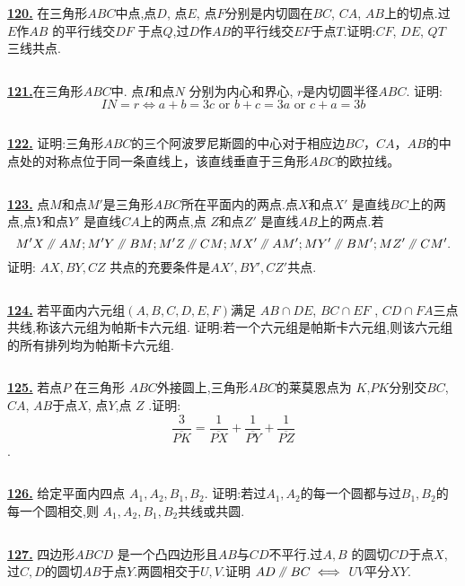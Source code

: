 \documentclass{article}
\newcommand\pxx{%
\mathrel{\text{\tikz[baseline] \draw (0em,-0.3ex) -- (.4em,1.7ex) (.2em,-0.3ex) -- (.6em,1.7ex);}%
}}
\begin{document}
$$ $$


\href{ http://www.artofproblemsolving.com/Forum/viewtopic.php?p=143448#p143448
}{\bf 120.} 在三角形$ABC$中点,点$D$, 点$E$, 点$F$分别是内切圆在$BC$, $CA$, $AB$上的切点.过$E$作$AB$ 的平行线交$DF$ 于点$Q$,过$D$作$AB$的平行线交$EF$于点$T$.证明:$CF$, $DE$, $QT$ 三线共点.


$$ $$


\href{ http://www.artofproblemsolving.com/Forum/viewtopic.php?p=144399#p144399
}{\bf 121.}在三角形$ABC$中. 点$I$和点$N$ 分别为内心和界心, $r$是内切圆半径$ABC.$ 证明:
$$IN=r \iff  a+b=3c \text{ or } b+c=3a \text{ or } c+a=3b$$


$$ $$


\href{http://www.artofproblemsolving.com/Forum/viewtopic.php?p=149725#p149725
 }{\bf 122.} 证明:三角形$ABC$的三个阿波罗尼斯圆的中心对于相应边$BC$，$CA$，$AB$的中点处的对称点位于同一条直线上，该直线垂直于三角形$ABC$的欧拉线。


$$ $$


\href{http://www.artofproblemsolving.com/Forum/viewtopic.php?p=10533#p10533
 }{\bf 123.} 点$M$和点$M'$是三角形$ABC$所在平面内的两点.点$X$和点$X'$ 是直线$BC$上的两点,点$Y$和点$Y'$ 是直线$CA$上的两点,点 $Z$和点$Z'$ 是直线$AB$上的两点.若
$$M'X  \pxx  AM; M'Y \pxx  BM; M'Z \pxx  CM; MX' \pxx  AM'; MY' \pxx  BM'; MZ' \pxx  CM'. $$
证明: $AX, BY, CZ$ 共点的充要条件是$AX', BY', CZ'$共点.


$$ $$


\href{http://www.artofproblemsolving.com/Forum/viewtopic.php?p=154202#p154202
 }{\bf 124.} 若平面内六元组$(A, B, C, D, E, F)$满足 $AB\cap DE$, $BC\cap EF$ , $CD\cap FA$三点共线,称该六元组为帕斯卡六元组.
证明:若一个六元组是帕斯卡六元组,则该六元组的所有排列均为帕斯卡六元组.


$$ $$


\href{http://www.artofproblemsolving.com/Forum/viewtopic.php?p=157209#p157209
 }{\bf 125.} 若点$ P$ 在三角形 $ ABC$外接圆上,三角形$ABC$的莱莫恩点为 $ K$,$ PK$分别交$ BC$, $ CA$, $ AB$于点$ X$, 点$ Y$,点 $ Z$ .证明:
$$ \frac{3}{\overline{PK}}=\frac{1}{\overline{PX}}+\frac{1}{\overline{PY}}+\frac{1}{\overline{PZ}}$$
.


$$ $$


\href{http://www.artofproblemsolving.com/Forum/viewtopic.php?p=121765#p121765
 }{\bf 126.} 给定平面内四点 $A_1,A_2,B_1,B_2$. 证明:若过$A_1,A_2$的每一个圆都与过$B_1,B_2$的每一个圆相交,则 $A_1,A_2,B_1,B_2$共线或共圆.


$$ $$


\href{ http://www.artofproblemsolving.com/Forum/viewtopic.php?p=131325#p131325
}{\bf 127.} 四边形$ABCD$ 是一个凸四边形且$AB$与$CD$不平行.过$A,B$ 的圆切$CD$于点$X$,过$C,D$的圆切$AB$于点$Y$.两圆相交于$U,V$.证明 $AD\pxx BC\iff$ $UV$平分$XY$.
\end{document}
